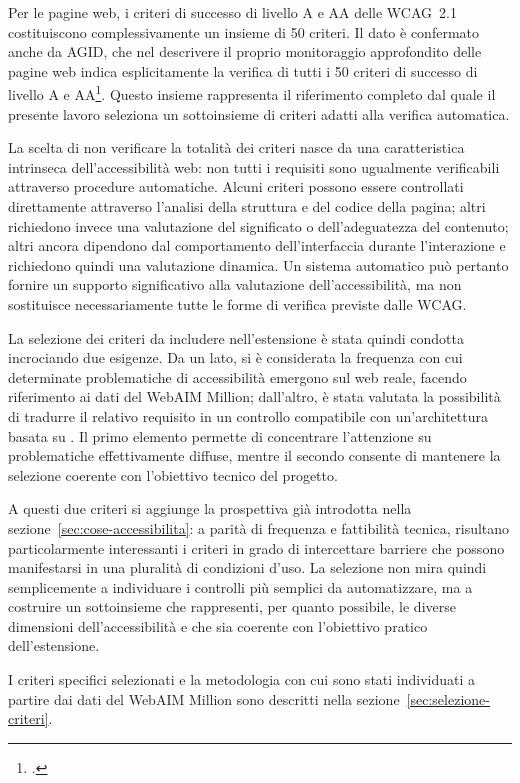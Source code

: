Per le pagine web, i criteri di successo di livello A e AA delle WCAG~2.1 costituiscono complessivamente un insieme di 50 criteri. Il dato è confermato anche da AGID, che nel descrivere il proprio monitoraggio approfondito delle pagine web indica esplicitamente la verifica di tutti i 50 criteri di successo di livello A e AA\footcite{agid:lg-stanca}. Questo insieme rappresenta il riferimento completo dal quale il presente lavoro seleziona un sottoinsieme di criteri adatti alla verifica automatica.

La scelta di non verificare la totalità dei criteri nasce da una caratteristica intrinseca dell'accessibilità web: non tutti i requisiti sono ugualmente verificabili attraverso procedure automatiche. Alcuni criteri possono essere controllati direttamente attraverso l'analisi della struttura e del codice della pagina; altri richiedono invece una valutazione del significato o dell'adeguatezza del contenuto; altri ancora dipendono dal comportamento dell'interfaccia durante l'interazione e richiedono quindi una valutazione dinamica. Un sistema automatico può pertanto fornire un supporto significativo alla valutazione dell'accessibilità, ma non sostituisce necessariamente tutte le forme di verifica previste dalle WCAG.

La selezione dei criteri da includere nell'estensione è stata quindi condotta incrociando due esigenze. Da un lato, si è considerata la frequenza con cui determinate problematiche di accessibilità emergono sul web reale, facendo riferimento ai dati del WebAIM Million; dall'altro, è stata valutata la possibilità di tradurre il relativo requisito in un controllo compatibile con un'architettura basata su . Il primo elemento permette di concentrare l'attenzione su problematiche effettivamente diffuse, mentre il secondo consente di mantenere la selezione coerente con l'obiettivo tecnico del progetto.

A questi due criteri si aggiunge la prospettiva già introdotta nella sezione~\ref{sec:cose-accessibilita}: a parità di frequenza e fattibilità tecnica, risultano particolarmente interessanti i criteri in grado di intercettare barriere che possono manifestarsi in una pluralità di condizioni d'uso. La selezione non mira quindi semplicemente a individuare i controlli più semplici da automatizzare, ma a costruire un sottoinsieme che rappresenti, per quanto possibile, le diverse dimensioni dell'accessibilità e che sia coerente con l'obiettivo pratico dell'estensione.

I criteri specifici selezionati e la metodologia con cui sono stati individuati a partire dai dati del WebAIM Million sono descritti nella sezione~\ref{sec:selezione-criteri}.

